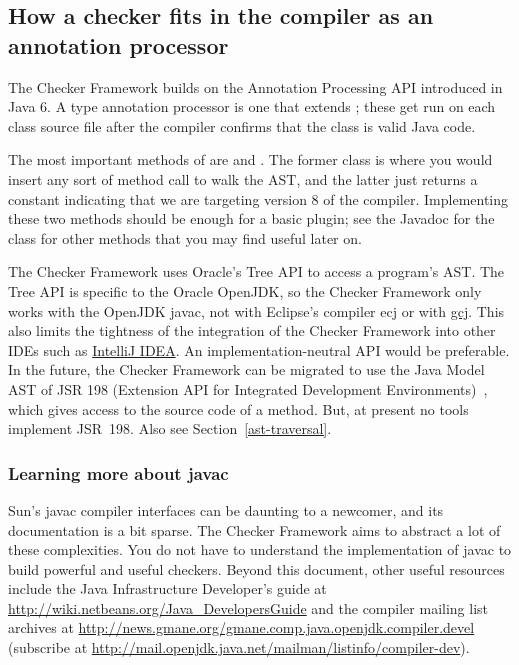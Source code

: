 \subsection{How a checker fits in the compiler as an annotation processor\label{checker-as-annotation-processor}}

The Checker Framework builds on the Annotation Processing API
introduced in Java 6.  A type annotation processor is one that extends
; these get run on each class
source file after the compiler confirms that the class is valid Java code.

The most important methods of 
are  and . The former
class is where you would insert any sort of method call to walk the AST\@,
and the latter just returns a constant indicating that we are targeting
version 8 of the compiler. Implementing these two methods should be enough
for a basic plugin; see the Javadoc for the class for other methods that
you may find useful later on.

The Checker Framework uses Oracle's Tree API to access a program's AST\@.
The Tree API is specific to the Oracle OpenJDK, so the Checker Framework only
works with the OpenJDK javac, not with Eclipse's compiler ecj or with
\href{http://gcc.gnu.org/java/}{gcj}.  This also limits the tightness of
the integration of the Checker Framework into other IDEs such as \href{http://www.jetbrains.com/idea/}{IntelliJ IDEA}\@.
An implementation-neutral API would be preferable.
In the future, the Checker Framework
can be migrated to use the Java Model AST of JSR 198 (Extension API for
Integrated Development Environments)~\cite{JSR198}, which gives access to
the source code of a method.  But, at present no tools
implement JSR~198.  Also see Section~\ref{ast-traversal}.



\subsubsection{Learning more about javac\label{learning-more-about-javac}}

Sun's javac compiler interfaces can be daunting to a
newcomer, and its documentation is a bit sparse. The Checker Framework
aims to abstract a lot of these complexities.
You do not have to understand the implementation of javac to
build powerful and useful checkers.
Beyond this document, 
other useful resources include the Java Infrastructure
Developer's guide at
\url{http://wiki.netbeans.org/Java_DevelopersGuide} and the compiler
mailing list archives at
\url{http://news.gmane.org/gmane.comp.java.openjdk.compiler.devel}
(subscribe at
\url{http://mail.openjdk.java.net/mailman/listinfo/compiler-dev}).



